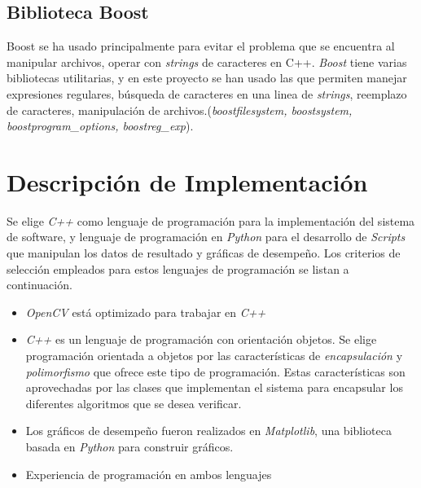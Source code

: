 \subsection{Biblioteca Boost}
Boost \cite{boost} se ha usado principalmente para evitar el problema que se encuentra al manipular archivos, operar con \textit{strings} de caracteres en C++. \textit{Boost} tiene varias bibliotecas utilitarias, y en este proyecto se han usado las que permiten manejar expresiones regulares, búsqueda de caracteres en una linea de \textit{strings}, reemplazo de caracteres, manipulación de archivos.(\textit{boost\:\:filesystem, boost\:\:system, boost\:\:program\_options, boost\:\:reg\_exp}).



\section{Descripción de Implementación}

Se elige \textit{C++} como lenguaje de programación para la implementación del sistema de software, y lenguaje de programación en \textit{Python} para el desarrollo de \textit{Scripts} que manipulan los datos de resultado y gráficas de desempeño. Los criterios de selección empleados para estos lenguajes de programación se listan a continuación.
 
\begin{itemize}
\item \textit{OpenCV} está optimizado para trabajar en \textit{C++}
\item \textit{C++} es un lenguaje de programación con orientación objetos. Se elige programación orientada a objetos por las características de \textit{encapsulación} y \textit{polimorfismo} que ofrece este tipo de programación. Estas características son aprovechadas por las clases que implementan el sistema para  encapsular los diferentes algoritmos que se desea verificar.
\item Los gráficos de desempeño fueron realizados en \textit{Matplotlib}\cite{matplotlib}, una biblioteca basada en \textit{Python} para construir gráficos. 
\item Experiencia de programación en ambos lenguajes
\end{itemize}

%


